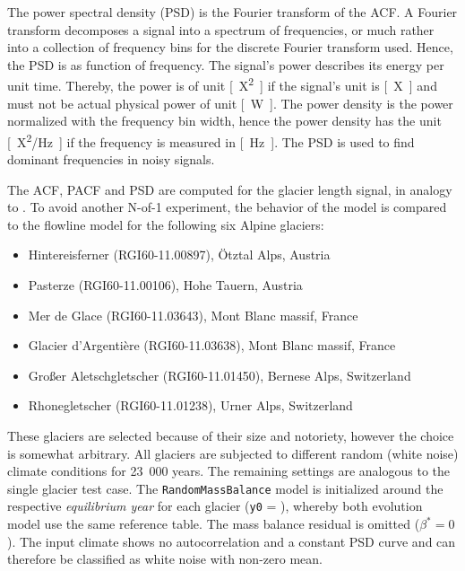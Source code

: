        The power spectral density (PSD) is the Fourier transform of the ACF. A Fourier transform decomposes a signal into a spectrum of frequencies, or much rather into a collection of frequency bins for the discrete Fourier transform used. Hence, the PSD is as function of frequency. The signal's power describes its energy per unit time. Thereby, the power is of unit \si{[X^2]} if the signal's unit is \si{[X]} and must not be actual physical power of unit \si{[\watt]}. The power density is the power normalized with the frequency bin width, hence the power density has the unit \si{[X^2/\hertz]} if the frequency is measured in \si{[\hertz]}. The PSD is used to find dominant frequencies in noisy signals.

        The ACF, PACF and PSD are computed for the glacier length signal, in analogy to \citep{Roe2014}. To avoid another N-of-1 experiment, the behavior of the \vas{} model is compared to the flowline model for the following six Alpine glaciers:
        \begin{itemize}
            \item Hintereisferner (RGI60-11.00897), Ötztal Alps, Austria
            \item Pasterze (RGI60-11.00106), Hohe Tauern, Austria
            \item Mer de Glace (RGI60-11.03643), Mont Blanc massif, France
            \item Glacier d'Argentière (RGI60-11.03638), Mont Blanc massif, France
            \item Großer Aletschgletscher (RGI60-11.01450), Bernese Alps, Switzerland
            \item Rhonegletscher (RGI60-11.01238), Urner Alps, Switzerland
        \end{itemize}
        These glaciers are selected because of their size and notoriety, however the choice is somewhat arbitrary. All glaciers are subjected to different random (white noise) climate conditions for 23\ 000 years. The remaining settings are analogous to the single glacier test case. The \lstinline`RandomMassBalance` model is initialized around the respective \textit{equilibrium year} for each glacier (\lstinline`y0` = \tstar), whereby both evolution model use the same \tstar{} reference table. The mass balance residual is omitted ($\beta^* = 0$). The input climate shows no autocorrelation and a constant PSD curve and can therefore be classified as white noise with non-zero mean.
